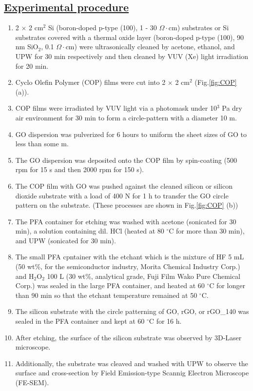\documentclass[platex,dvipdfmx]{jlreq}			%
\begin{document}
\subsection*{\ul{Experimental procedure}}
\begin{enumerate}
    \item 2 $\times$ 2 cm$^2$ Si (boron-doped p-type (100), 1 - 30 $\Omega\cdot$cm) substrates or Si substrates covered with a thermal oxide layer (boron-doped p-type (100), 90 nm SiO$_2$, 0.1 $\Omega\cdot$cm) were ultrasonically cleaned by acetone, ethanol, and UPW for 30 min respectively and then cleaned by VUV (Xe) light irradiation for 20 min.
    \item Cyclo Olefin Polymer (COP) films were cut into 2 $\times$ 2 cm$^2$ (Fig.\ref{fig:COP} (a)).
    \item COP films were irradiated by VUV light via a photomask under 10$^3$ Pa dry air environment for 30 min to form a circle-pattern with a diameter 10 \textmu m. 
    \item GO dispersion was pulverized for 6 hours to uniform the sheet sizes of GO to less than some \textmu m.
    \item The GO dispersion was deposited onto the COP film by spin-coating (500 rpm for 15 s and then 2000 rpm for 150 s).
    \item The COP film with GO was pushed against the cleaned silicon or silicon dioxide substrate with a load of 400 N for 1 h to transfer the GO circle pattern on the substrate. (These processes are shown in Fig.\ref{fig:COP} (b))
    \item The PFA container for etching was washed with acetone (sonicated for 30 min), a solution containing dil. HCl (heated at 80 ${}^\circ$C for more than 30 min), and UPW (sonicated for 30 min).
    \item The small PFA cpntainer with the etchant which is the mixture of HF 5 mL (50 wt\%, for the semiconductor industry, Morita Chemical Industry Corp.) and H$_2$O$_2$ 100 \textmu L (30 wt\%, analytical grade, Fuji Film Wako Pure Chemical Corp.) was sealed in the large PFA container, and heated at 60 ${}^\circ$C for longer than 90 min so that the etchant temperature remained at 50 ${}^\circ$C.
    \item The silicon substrate with the circle patterning of GO, rGO, or rGO\_140 was sealed in the PFA container and kept at 60 ${}^\circ$C for 16 h.
    \item After etching, the surface of the silicon substrate was observed by 3D-Laser microscope.
    \item Additionally, the substrate was cleaved and washed with UPW to observe the surface and cross-section by Field Emission-type Scannig Electron Microscope (FE-SEM).
\end{enumerate}
\end{document}
